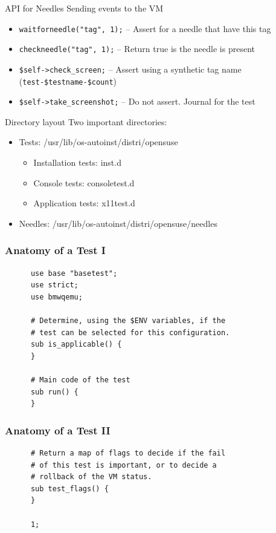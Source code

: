 \documentclass{beamer}
\begin{document}
\begin{frame}{API for Needles}
  Sending events to the VM
  \begin{itemize}
  \item \texttt{waitforneedle("tag", 1);} -- Assert for a needle that have this tag
  \item \texttt{checkneedle("tag", 1);} -- Return true is the needle is present
  \item \texttt{\$self->check\_screen;} -- Assert using a synthetic tag name (\texttt{test-\$testname-\$count})
  \item \texttt{\$self->take\_screenshot;} -- Do not assert. Journal for the test
  \end{itemize}
\end{frame}

%
%
\begin{frame}{Directory layout}
  Two important directories:
  \begin{itemize}
  \item Tests: /usr/lib/os-autoinst/distri/opensuse
    \begin{itemize}
    \item Installation tests: inst.d
    \item Console tests: consoletest.d
    \item Application tests: x11test.d
    \end{itemize}
  \item Needles: /usr/lib/os-autoinst/distri/opensuse/needles
  \end{itemize}
\end{frame}

%
%
\begin{frame}[fragile]
  \frametitle{Anatomy of a Test I}
    \lstset{style=myperl}
    \begin{lstlisting}
      use base "basetest";
      use strict;
      use bmwqemu;

      # Determine, using the $ENV variables, if the
      # test can be selected for this configuration.
      sub is_applicable() {
      }

      # Main code of the test
      sub run() {
      }
    \end{lstlisting}
\end{frame}

\begin{frame}[fragile]
  \frametitle{Anatomy of a Test II}
    \lstset{style=myperl}
    \begin{lstlisting}
      # Return a map of flags to decide if the fail
      # of this test is important, or to decide a
      # rollback of the VM status.
      sub test_flags() {
      }

      1;
    \end{lstlisting}
\end{frame}
\end{document}
